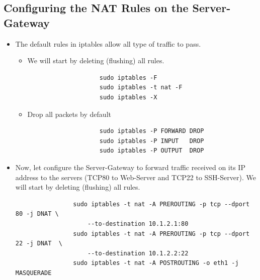 \subsection{Configuring the NAT Rules on the Server-Gateway}
\begin{itemize}
	\item The default rules in iptables allow all type of traffic to pass.

		\begin{itemize}
			\item We will start by deleting (flushing) all rules.
			\begin{verbatim}
					sudo iptables -F
					sudo iptables -t nat -F
					sudo iptables -X
			\end{verbatim}

			\item Drop all packets by default
			\begin{verbatim}
					sudo iptables -P FORWARD DROP
					sudo iptables -P INPUT   DROP
					sudo iptables -P OUTPUT  DROP
			\end{verbatim}
		\end{itemize}

	\item Now, let configure the Server-Gateway to forward traffic received on its IP address to the servers (TCP80 to Web-Server and TCP22 to SSH-Server). We will start by deleting (flushing) all rules.
		\begin{verbatim}
				sudo iptables -t nat -A PREROUTING -p tcp --dport 80 -j DNAT \
					--to-destination 10.1.2.1:80
				sudo iptables -t nat -A PREROUTING -p tcp --dport 22 -j DNAT  \
					--to-destination 10.1.2.2:22
				sudo iptables -t nat -A POSTROUTING -o eth1 -j MASQUERADE
		\end{verbatim}
\end{itemize}

